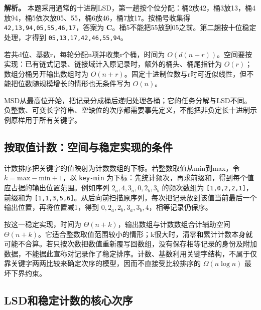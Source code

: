 \textbf{解析。} 本题采用通常的十进制LSD，第一趟按个位分配：桶2放42，桶3放13，桶4放94，桶5依次放05、55，桶6放46，桶7放17。按桶号收集得 \texttt{42,\allowbreak{}13,\allowbreak{}94,\allowbreak{}05,\allowbreak{}55,\allowbreak{}46,\allowbreak{}17}，答案为 \textbf{C}。桶5不能把55放到05之前。第二趟按十位稳定处理，才得到 \texttt{05,\allowbreak{}13,\allowbreak{}17,\allowbreak{}42,\allowbreak{}46,\allowbreak{}55,\allowbreak{}94}。

若共d位、基数r，每轮分配n项并收集r个桶，时间为 \(O(d(n+r))\)。空间要按实现：已有链式记录、链接域计入原记录时，额外的桶头、桶尾指针为 \(O(r)\)；数组分桶另开输出数组时为 \(O(n+r)\)。固定十进制位数与r时可近似线性，但不能把位数随规模增长的情形也无条件写为 \(O(n)\)。

MSD从最高位开始，把记录分成桶后递归处理各桶；它的任务分解与LSD不同。负整数、可变长字符串、空缺位的次序都需要事先定义，不能把非负定长十进制示例原样用于所有关键字。

\subsection{按取值计数：空间与稳定实现的条件}\label{ux6309ux53d6ux503cux8ba1ux6570ux7a7aux95f4ux4e0eux7a33ux5b9aux5b9eux73b0ux7684ux6761ux4ef6}

计数排序把关键字的值映射为计数数组的下标。若整数取值从min到max，令 \(k=\mathrm{max}-\mathrm{min}+1\)，以 \texttt{key-min} 为下标：先统计频次，再求前缀和，得到每个值应占据的输出位置范围。例如序列 \(2_a,4,3_a,0,2_b,3_b\) 的频次数组为 \texttt{[\allowbreak{}1,\allowbreak{}0,\allowbreak{}2,\allowbreak{}2,\allowbreak{}1]\allowbreak{}}，前缀和为 \texttt{[\allowbreak{}1,\allowbreak{}1,\allowbreak{}3,\allowbreak{}5,\allowbreak{}6]\allowbreak{}}。从后向前扫描原序列，每次把记录放到该值当前最后一个输出位置，再将位置减1，得到 \(0,2_a,2_b,3_a,3_b,4\)，相等记录仍保序。

按这一稳定实现，时间为 \(\Theta(n+k)\)，输出数组与计数数组合计辅助空间 \(\Theta(n+k)\)。它适合整数取值范围较小的情形；k很大时，清零和累计计数本身就可能不合算。若只按次数把数值重新覆写回数组，没有保存相等记录的身份及附加数据，不能据此宣称对记录作了稳定排序。计数、基数利用关键字结构，不属于仅靠关键字两两比较来确定次序的模型，因而不直接受比较排序的 \(\Omega(n\log n)\) 最坏下界约束。

\subsection{LSD和稳定计数的核心次序}\label{DS08-distribute-code}

